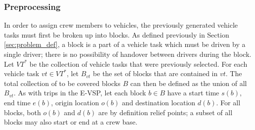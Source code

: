 \documentclass[]{article}
\begin{document}
\subsubsection{Preprocessing}
In order to assign crew members to vehicles, the previously generated vehicle tasks must first be broken up into blocks. As defined previously in Section \ref{sec:problem_def}, a block is a part of a vehicle task which must be driven by a single driver; there is no possibility of handover between drivers during the block. Let $VT^*$ be the collection of vehicle tasks that were previously selected. For each vehicle task $vt \in VT^*$, let $B_{vt}$ be the set of blocks that are contained in $vt$. The total collection of to be covered blocks $B$ can then be defined as the union of all $B_{vt}$. As with trips in the E-VSP, let each block $b \in B$ have a start time $s(b)$, end time $e(b)$, origin location $o(b)$ and destination location $d(b)$. For all blocks, both $o(b)$ and $d(b)$ are by definition relief points; a subset of all blocks may also start or end at a crew base.
\end{document}
